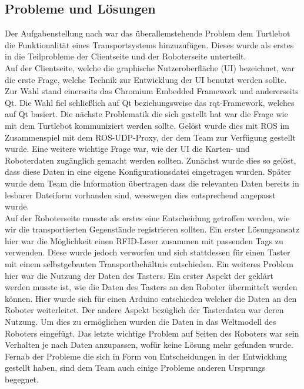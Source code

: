 \documentclass[a4paper,12pt,headsepline]{scrartcl}
\begin{document}
	\subsection{Probleme und Lösungen}
Der Aufgabenstellung nach war das überallemstehende Problem dem Turtlebot die Funktionalität eines Transportsystems hinzuzufügen. Dieses wurde als erstes in die Teilprobleme der Clientseite und der Roboterseite unterteilt.\\
Auf der Clientseite, welche die graphische Nutzeroberfläche (UI) bezeichnet, war die erste Frage, welche Technik zur Entwicklung der UI benutzt werden sollte. Zur Wahl stand einerseits das Chromium Embedded Framework und andererseits Qt. Die Wahl fiel schließlich auf Qt beziehungsweise das rqt-Framework, welches auf Qt basiert. Die nächste Problematik die sich gestellt hat war die Frage wie mit dem Turtlebot kommuniziert werden sollte. Gelöst wurde dies mit ROS im Zusammenspiel mit dem ROS-UDP-Proxy, der dem Team zur Verfügung gestellt wurde. Eine weitere wichtige Frage war, wie der UI die Karten- und Roboterdaten zugänglich gemacht werden sollten. Zunächst wurde dies so gelöst, dass diese Daten in eine eigene Konfigurationsdatei eingetragen wurden. Später wurde dem Team die Information übertragen dass die relevanten Daten bereits in lesbarer Dateiform vorhanden sind, wesswegen dies entsprechend angepasst wurde.\\
Auf der Roboterseite musste als erstes eine Entscheidung getroffen werden, wie wir die transportierten Gegenstände registrieren sollten. Ein erster Lösungsansatz hier war die Möglichkeit einen RFID-Leser zusammen mit passenden Tags zu verwenden. Diese wurde jedoch verworfen und sich stattdessen für einen Taster mit einem selbstgebauten Transportbehältnis entschieden. Ein weiteres Problem hier war die Nutzung der Daten des Tasters. Ein erster Aspekt der geklärt werden musste ist, wie die Daten des Tasters an den Roboter übermittelt werden können. Hier wurde sich für einen Arduino entschieden welcher die Daten an den Roboter weiterleitet. Der andere Aspekt bezüglich der Tasterdaten war deren Nutzung. Um dies zu ermöglichen wurden die Daten in das Weltmodell des Roboters eingefügt. Das letzte wichtige Problem auf Seiten des Roboters war sein Verhalten je nach Daten anzupassen, wofür keine Lösung mehr gefunden wurde.\\
Fernab der Probleme die sich in Form von Entscheidungen in der Entwicklung gestellt haben, sind dem Team auch einige Probleme anderen Ursprungs begegnet.\\
\end{document}
